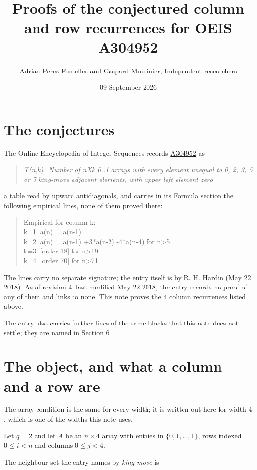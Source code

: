 \documentclass[11pt]{article}
\title{Proofs of the conjectured column and row recurrences for OEIS A304952}
\author{Adrian Perez Fontelles and Gaspard Moulinier, Independent researchers}
\date{09 September 2026}
\theoremstyle{definition}
\begin{document}
\maketitle
\section{The conjectures}

The Online Encyclopedia of Integer Sequences records \href{https://oeis.org/A304952}{A304952} as

\begin{quote}\itshape T(n,k)=Number of nXk 0..1 arrays with every element unequal to 0, 2, 3, 5 or 7 king-move adjacent elements, with upper left element zero\end{quote}

a table read by upward antidiagonals, and carries in its Formula section the following empirical lines, none of them proved there:

\begin{quote}\ttfamily Empirical for column k:\\
k=1: a(n) = a(n-1)\\k=2: a(n) = a(n-1) +3*a(n-2) -4*a(n-4) for n>5\\k=3: [order 18] for n>19\\k=4: [order 70] for n>71\end{quote}

The lines carry no separate signature; the entry itself is by R. H. Hardin (May 22 2018). As of revision 4, last modified May 22 2018, the entry records no proof of any of them and links to none. This note proves the 4 column recurrences listed above.

The entry also carries further lines of the same blocks that this note does not settle; they are named in Section 6.

\section{The object, and what a column and a row are}

The array condition is the same for every width; it is written out here for width $4$, which is one of the widths this note uses.

Let $q = 2$ and let $A$ be an $n \times 4$ array with entries in $\{0,1,\dots,1\}$, rows indexed $0 \le i < n$ and columns $0 \le j < 4$.

The neighbour set the entry names by {\itshape king-move} is
\end{document}
